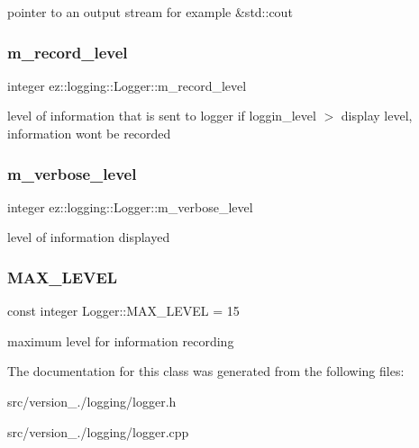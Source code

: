 pointer to an output stream for example \&std\+::cout \mbox{\label{classez_1_1logging_1_1Logger_a89f9c24612c5f6dfcc9bec176cec4ee0}} 
\subsubsection{\texorpdfstring{m\+\_\+record\+\_\+level}{m\_record\_level}}
{\footnotesize\ttfamily integer ez\+::logging\+::\+Logger\+::m\+\_\+record\+\_\+level\hspace{0.3cm}{\ttfamily [protected]}}

level of information that is sent to logger if loggin\+\_\+level $>$ display level, information won\textquotesingle{}t be recorded \mbox{\label{classez_1_1logging_1_1Logger_a2e236ad54b47f938d0bea066ac7c2c00}} 
\subsubsection{\texorpdfstring{m\+\_\+verbose\+\_\+level}{m\_verbose\_level}}
{\footnotesize\ttfamily integer ez\+::logging\+::\+Logger\+::m\+\_\+verbose\+\_\+level\hspace{0.3cm}{\ttfamily [protected]}}

level of information displayed \mbox{\label{classez_1_1logging_1_1Logger_a917e91166081de05403eba37ce05bdd5}} 
\subsubsection{\texorpdfstring{M\+A\+X\+\_\+\+L\+E\+V\+EL}{MAX\_LEVEL}}
{\footnotesize\ttfamily const integer Logger\+::\+M\+A\+X\+\_\+\+L\+E\+V\+EL = 15\hspace{0.3cm}{\ttfamily [static]}}

maximum level for information recording 

The documentation for this class was generated from the following files\+:\begin{DoxyCompactItemize}
\item 
src/version\+\_./logging/logger.\+h\item 
src/version\+\_./logging/logger.\+cpp\end{DoxyCompactItemize}
